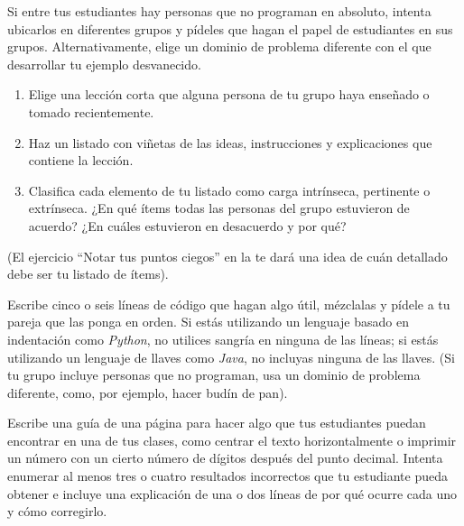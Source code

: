 Si entre tus estudiantes hay personas que no programan en absoluto,
intenta ubicarlos en diferentes grupos
y pídeles que hagan el papel de estudiantes en sus grupos.
Alternativamente,
elige un dominio de problema diferente con el que desarrollar tu ejemplo desvanecido.



\begin{enumerate}

\item
  Elige una lección corta que alguna persona de tu grupo haya enseñado o tomado recientemente.

\item
  Haz un listado con viñetas de las ideas, instrucciones y explicaciones que contiene la lección.

\item
  Clasifica cada elemento de tu listado como carga intrínseca, pertinente o extrínseca.
  ¿En qué ítems todas las personas del grupo estuvieron de acuerdo?
  ¿En cuáles estuvieron en desacuerdo y por qué?

\end{enumerate}

(El ejercicio ``Notar tus puntos ciegos'' en la 
te dará una idea de cuán detallado debe ser tu listado de ítems).



Escribe cinco o seis líneas de código que hagan algo útil,
mézclalas y pídele a tu pareja que las ponga en orden.
Si estás utilizando un lenguaje basado en indentación como \emph{Python},
no utilices sangría en ninguna de las líneas;
si estás utilizando un lenguaje de llaves como \emph{Java},
no incluyas ninguna de las llaves.
(Si tu grupo incluye personas que no programan,
usa un dominio de problema diferente,
como, por ejemplo, hacer budín de pan).



Escribe una guía de una página para hacer algo que tus estudiantes puedan encontrar en una de tus clases,
como centrar el texto horizontalmente
o imprimir un número con un cierto número de dígitos después del punto decimal.
Intenta enumerar al menos tres o cuatro resultados incorrectos que tu estudiante pueda obtener
e incluye una explicación de una o dos líneas
de por qué ocurre cada uno y cómo corregirlo.



